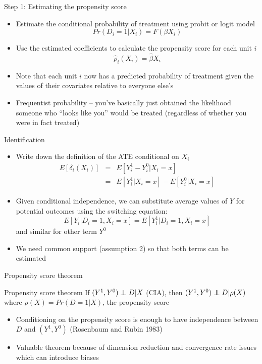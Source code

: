 \documentclass{beamer}
\newcommand\independent{\protect\mathpalette{\protect\independenT}{\perp}}
\def\independenT#1#2{\mathrel{\rlap{$#1#2$}\mkern2mu{#1#2}}}
\begin{document}
\begin{frame}{Step 1: Estimating the propensity score}

		\begin{itemize}
		\item Estimate the conditional probability of treatment using probit or logit model$$Pr(D_i=1|X_i) = F(\beta X_i)$$
		\item Use the estimated coefficients to calculate the propensity score for each unit $i$$$\widehat{\rho}_i(X_i) = \widehat{\beta} X_i$$
		\item Note that each unit $i$ now has a predicted probability of treatment given the values of their covariates relative to everyone else's 
		\item Frequentist probability -- you've basically just obtained the likelihood someone who ``looks like you'' would be treated (regardless of whether you were in fact treated)
		\end{itemize}
\end{frame}

\begin{frame}{Identification}
	
	\begin{itemize}
	\item Write down the definition of the ATE conditional on $X_i$
		\begin{eqnarray*}
		E[\delta_i(X_i) ]&=& E[Y^1_i - Y^0_i | X_i=x] \\
		&=&E[Y^1_i | X_i=x] - E[Y^0_i | X_i=x]
		\end{eqnarray*}
	\item Given conditional independence, we can substitute average values of $Y$ for potential outcomes using the switching equation: $$E[Y_i | D_i =1, X_i=x]=E[Y_i^1 | D_i=1, X_i=x]$$ and similar for other term $Y^0$
	\item We need common support (assumption 2) so that both terms can be estimated
	\end{itemize}
\end{frame}		


\begin{frame}{Propensity score theorem}
	
	\begin{block}{Propensity score theorem}
	If $(Y^1,Y^0)\independent{D}|X$ (CIA), then $(Y^1,Y^0)\independent{D} | \rho(X)$ where $\rho(X)=Pr(D=1|X)$, the propensity score
	\end{block}
	
	\begin{itemize}
	\item Conditioning on the propensity score is enough to have independence between $D$ and $(Y^1,Y^0)$ (Rosenbaum and Rubin 1983)
	 \item Valuable theorem because of dimension reduction and convergence rate issues which can introduce biases
	\end{itemize}
\end{frame}
\end{document}

